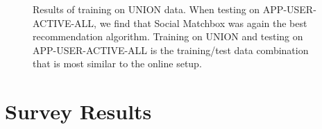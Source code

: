 \begin{figure}[h]
\caption{Results of training on UNION data. When testing on APP-USER-ACTIVE-ALL, we find that Social Matchbox was again the best recommendation algorithm. Training on UNION and testing on APP-USER-ACTIVE-ALL is the training/test data combination that is most similar to the online setup.}
\end{figure}

\section{Survey Results}

